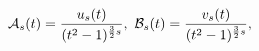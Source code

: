 \[{\cal A}_{s}(t)=\frac{u_{s}(t)}{(t^{2}-1)^{\frac{3}{2}s}},~{}{\cal B}_{s}(t)=%
\frac{v_{s}(t)}{(t^{2}-1)^{\frac{3}{2}s}},\]
